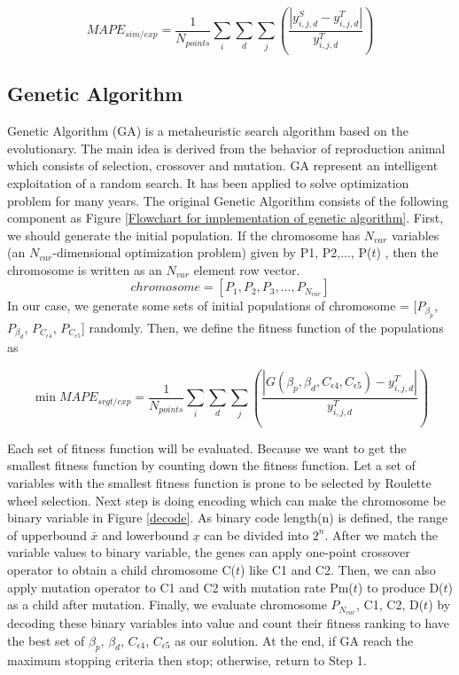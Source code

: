 \begin{equation}
\label{final sim/exp}
MAPE_{sim/exp}=\frac{1}{N_{points}}\sum_{i}\sum_{d}\sum_{j}\left ( \frac{\left |y_{i,j,d}^S-y_{i,j,d}^T \right |}{y_{i,j,d}^T} \right )
\end{equation}

\subsection{Genetic Algorithm}

Genetic Algorithm (GA) is a metaheuristic search algorithm based on the
evolutionary. The main idea is derived from the behavior of reproduction animal which consists of selection, crossover and mutation. GA represent an intelligent exploitation of a random search. It has been applied to solve optimization problem for many years. The original Genetic Algorithm consists of the following component as Figure \ref{Flowchart for implementation of genetic algorithm}. First, we should generate the initial population. If the chromosome has $N_{var}$ variables (an $N_{var}$-dimensional optimization problem) given by P1, P2,..., P($t$) , then the chromosome is written as an $N_{var}$ element row vector.
\begin{equation}
chromosome = [P_{1},P_{2},P_{3},…,P_{N_{var}}]
\end{equation}
In our case, we generate some sets of initial populations of chromosome = [$P_{\beta_{p}}$,$P_{\beta_{d}}$, $P_{C_{\epsilon4}}$, $P_{C_{\epsilon5}}$] randomly. Then, we define the fitness function of the populations as

\begin{equation}
\label{gasrgt/exp}
\min MAPE_{srgt/exp}=\frac{1}{N_{points}}\sum_{i}\sum_{d}\sum_{j}\left ( \frac{\left |G(\beta_{p}, \beta_{d}, C_{\epsilon4}, C_{\epsilon5})-y_{i,j,d}^T \right |}{y_{i,j,d}^T} \right )
\end{equation}

Each set of fitness function will be evaluated. Because we want to get the
smallest fitness function by counting down the fitness function. Let a set of variables with the smallest fitness function is prone to be selected by Roulette wheel selection. Next step is doing encoding which can make the chromosome be binary variable in Figure \ref{decode}. As binary code length(n) is defined, the range of upperbound $\bar{x}$ and lowerbound $\underline{x}$ can be divided into $2^{n}$. After we match the variable values to binary variable, the genes can apply one-point crossover operator to obtain a child chromosome C($t$) like C1 and C2. Then, we can also apply mutation operator to C1 and C2 with mutation rate Pm($t$) to produce D($t$) as a child after mutation. Finally, we evaluate chromosome $P_{N_{var}}$, C1, C2, D($t$) by decoding these binary variables into value and count their fitness ranking to have the best set of $\beta_{p}$, $\beta_{d}$, $C_{\epsilon4}$, $C_{\epsilon5}$ as our solution. At the end, if GA reach the maximum stopping criteria then stop; otherwise, return to Step 1.

